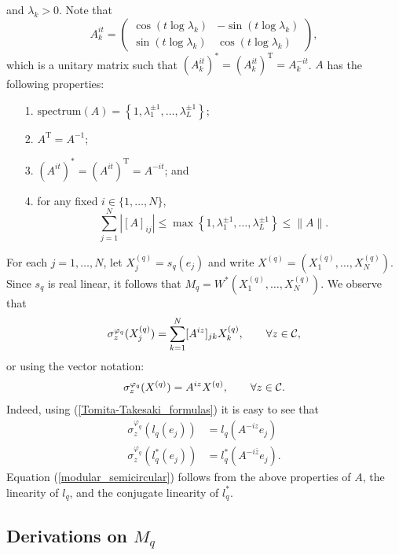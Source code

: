 and $\lambda_k>0$. Note that
	\begin{equation*}
		A_k^{it}=\left(\begin{array}{cc}	\cos(t\log{\lambda_k})	&	-\sin(t\log{\lambda_k})\\
								\sin(t\log{\lambda_k}) 	& 	\cos(t\log{\lambda_k})\end{array}\right),
	\end{equation*}
which is a unitary matrix such that $(A_k^{it})^*=(A_k^{it})^\text{T}=A_k^{-it}$. $A$ has the following properties:
	\begin{enumerate}
		\item[1.] $\text{spectrum}(A)=\left\{1,\lambda_1^{\pm 1},\ldots, \lambda_L^{\pm 1}\right\}$;
		\item[2.] $A^\text{T}=A^{-1}$;
		\item[3.] $\left( A^{it}\right)^*=\left( A^{it}\right)^\text{T}=A^{-it}$; and
		\item[4.] for any fixed $i\in\{1,\ldots, N\}$, 
			\begin{equation*}
				\sum_{j=1}^N \left|[A]_{ij}\right|\leq \max\left\{1,\lambda_1^{\pm 1},\ldots, \lambda_L^{\pm 1}\right\}\leq \|A\|.
			\end{equation*}
	\end{enumerate}
For each $j=1,\ldots, N$, let $X_j^{(q)}=s_q(e_j)$ and write $X^{(q)}=(X_1^{(q)},\ldots, X_N^{(q)})$. Since $s_q$ is real linear, it follows that $M_q=W^*(X_1^{(q)},\ldots, X_N^{(q)})$. We observe that
	\begin{align*}
		\sigma_z^{\varphi_q}(X_j^{(q)})=\sum_{k=1}^N [A^{iz}]_{jk} X_k^{(q)},\qquad \forall z\in \mathcal C,
	\end{align*}
or using the vector notation:
	\begin{align}\label{modular_semicircular}
		\sigma_z^{\varphi_q}(X^{(q)})= A^{iz} X^{(q)},\qquad \forall z\in\mathcal C.
	\end{align}
Indeed, using (\ref{Tomita-Takesaki_formulas}) it is easy to see that
	\begin{align*}
		\sigma_z^{\varphi_q}(l_q(e_j))&= l_q(A^{-iz} e_j)\\
		\sigma_z^{\varphi_q}(l_q^*(e_j))&=l_q^*( A^{-i\bar{z}} e_j).
	\end{align*}
Equation (\ref{modular_semicircular}) follows from the above properties of $A$, the linearity of $l_q$, and the conjugate linearity of $l_q^*$.


\subsection{Derivations on $M_q$}\label{derivations_on_M_q}

